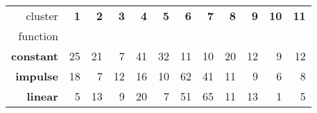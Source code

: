 \begin{tabular}{r|rrrrrrrrrrr}
cluster & \textbf{1} & \textbf{2} & \textbf{3} & \textbf{4} & \textbf{5} & \textbf{6} & \textbf{7} & \textbf{8} & \textbf{9} & \textbf{10} & \textbf{11} \\
function &  &  &  &  &  &  &  &  &  &  &  \\
\hline
\textbf{constant} & {\cellcolor[HTML]{65A3CB}} \color[HTML]{F1F1F1} 25 & {\cellcolor[HTML]{97B7D7}} \color[HTML]{000000} 21 & {\cellcolor[HTML]{FFF7FB}} \color[HTML]{000000} 7 & {\cellcolor[HTML]{023858}} \color[HTML]{F1F1F1} 41 & {\cellcolor[HTML]{0A73B2}} \color[HTML]{F1F1F1} 32 & {\cellcolor[HTML]{EDE8F3}} \color[HTML]{000000} 11 & {\cellcolor[HTML]{F2ECF5}} \color[HTML]{000000} 10 & {\cellcolor[HTML]{A4BCDA}} \color[HTML]{000000} 20 & {\cellcolor[HTML]{E7E3F0}} \color[HTML]{000000} 12 & {\cellcolor[HTML]{F6EFF7}} \color[HTML]{000000} 9 & {\cellcolor[HTML]{E7E3F0}} \color[HTML]{000000} 12 \\
\textbf{impulse} & {\cellcolor[HTML]{D9D8EA}} \color[HTML]{000000} 18 & {\cellcolor[HTML]{FDF5FA}} \color[HTML]{000000} 7 & {\cellcolor[HTML]{EFE9F3}} \color[HTML]{000000} 12 & {\cellcolor[HTML]{E0DEED}} \color[HTML]{000000} 16 & {\cellcolor[HTML]{F4EEF6}} \color[HTML]{000000} 10 & {\cellcolor[HTML]{023858}} \color[HTML]{F1F1F1} 62 & {\cellcolor[HTML]{358FC0}} \color[HTML]{F1F1F1} 41 & {\cellcolor[HTML]{F2ECF5}} \color[HTML]{000000} 11 & {\cellcolor[HTML]{F7F0F7}} \color[HTML]{000000} 9 & {\cellcolor[HTML]{FFF7FB}} \color[HTML]{000000} 6 & {\cellcolor[HTML]{FAF2F8}} \color[HTML]{000000} 8 \\
\textbf{linear} & {\cellcolor[HTML]{F5EFF6}} \color[HTML]{000000} 5 & {\cellcolor[HTML]{DEDCEC}} \color[HTML]{000000} 13 & {\cellcolor[HTML]{ECE7F2}} \color[HTML]{000000} 9 & {\cellcolor[HTML]{C0C9E2}} \color[HTML]{000000} 20 & {\cellcolor[HTML]{F1EBF4}} \color[HTML]{000000} 7 & {\cellcolor[HTML]{056AA6}} \color[HTML]{F1F1F1} 51 & {\cellcolor[HTML]{023858}} \color[HTML]{F1F1F1} 65 & {\cellcolor[HTML]{E5E1EF}} \color[HTML]{000000} 11 & {\cellcolor[HTML]{DEDCEC}} \color[HTML]{000000} 13 & {\cellcolor[HTML]{FFF7FB}} \color[HTML]{000000} 1 & {\cellcolor[HTML]{F5EFF6}} \color[HTML]{000000} 5 \\
\end{tabular}

